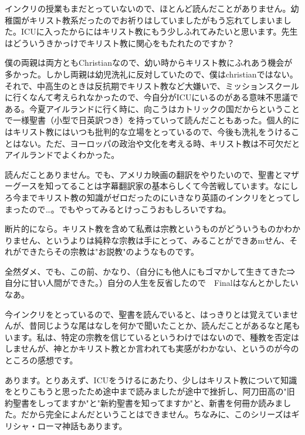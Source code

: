\item
インクリの授業もまだとっていないので、ほとんど読んだことがありません。幼稚園がキリスト教系だったのでお祈りはしていましたがもう忘れてしまいました。ICUに入ったからにはキリスト教にもう少しふれてみたいと思います。先生はどういうきかっけでキリスト教に関心をもたれたのですか？

\item
僕の両親は両方ともChristianなので、幼い時からキリスト教にふれあう機会が多かった。しかし両親は幼児洗礼に反対していたので、僕はchristianではない。それで、中高生のときは反抗期でキリスト教など大嫌いで、ミッションスクールに行くなんて考えられなかったので、今自分がICUにいるのがある意味不思議である。今夏アイルランドに行く時に、向こうはカトリックの国だからということで一様聖書（小型で日英訳つき）を持っていって読んだこともあった。個人的にはキリスト教にはいつも批判的な立場をとっているので、今後も洗礼をうけることはない。ただ、ヨーロッパの政治や文化を考える時、キリスト教は不可欠だとアイルランドでよくわかった。

\item
読んだことありません。でも、アメリカ映画の翻訳をやりたいので、聖書とマザーグースを知ってることは字幕翻訳家の基本らしくて今苦戦しています。なにしろ今までキリスト教の知識がゼロだったのにいきなり英語のインクリをとってしまったので…。でもやってみるとけっこうおもしろいですね。

\item
断片的になら。キリスト教を含めて私煮は宗教というものがどういうものかわかりません、というよりは純粋な宗教は手にとって、みることができあmせん、それができたらその宗教は"お説教"のようなものです。

\item
全然ダメ、でも、この前、かなり、（自分にも他人にもゴマかして生きてきた⇒自分に甘い人間ができた。）自分の人生を反省したので　Finalはなんとかしたいなあ。

\item
今インクリをとっているので、聖書を読んでいると、はっきりとは覚えていませんが、昔同じような尾はなしを何かで聞いたことか、読んだことがあるなと尾もいます。私は、特定の宗教を信じているというわけではないので、種教を否定はしませんが、神とかキリスト教とか言われても実感がわかない、というのが今のところの感想です。

\item
あります。とりあえず、ICUをうけるにあたり、少しはキリスト教について知識をとりこもうと思ったため途中まで読みましたが途中で挫折し、阿刀田高の"旧約聖書をしってますか"と"新約聖書を知ってますか"と、新書を何冊か読みました。だから完全によんだということはできません。ちなみに、このシリーズはギリシャ・ローマ神話もあります。
